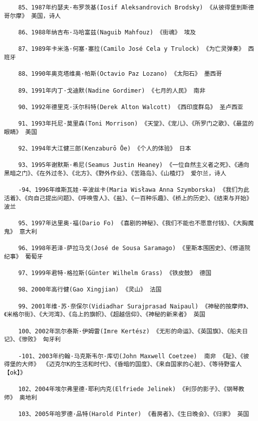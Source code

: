 \documentclass[UTF8]{../RepresentationUniverse}
\begin{document}
\begin{lstlisting}
    85、1987年约瑟夫·布罗茨基(Iosif Aleksandrovich Brodsky) 《从彼得堡到斯德哥尔摩》 美国，诗人
    
    86、1988年纳吉布·马哈富兹(Naguib Mahfouz) 《街魂》 埃及
    
    87、1989年卡米洛·何塞·塞拉(Camilo José Cela y Trulock) 《为亡灵弹奏》 西班牙
    
    88、1990年奥克塔维奥·帕斯(Octavio Paz Lozano) 《太阳石》 墨西哥
    
    89、1991年内丁·戈迪默(Nadine Gordimer) 《七月的人民》 南非
    
    90、1992年德里克·沃尔科特(Derek Alton Walcott) 《西印度群岛》 圣卢西亚
    
    91、1993年托尼·莫里森(Toni Morrison) 《天堂》、《宠儿》、《所罗门之歌》、《最蓝的眼睛》 美国
    
    92、1994年大江健三郎(Kenzaburō Ōe) 《个人的体验》 日本
    
    93、1995年谢默斯·希尼(Seamus Justin Heaney) 《一位自然主义者之死》、《通向黑暗之门》、《在外过冬》、《北方》、《野外作业》、《苦路岛》、《山楂灯》 爱尔兰，诗人
    
    -94、1996年维斯瓦娃·辛波丝卡(Maria Wisława Anna Szymborska) 《我们为此活着》、《向自己提出问题》、《呼唤雪人》、《盐》、《一百种乐趣》、《桥上的历史》、《结束与开始》 波兰
    
    95、1997年达里奥·福(Dario Fo) 《喜剧的神秘》、《我们不能也不愿意付钱》、《大胸魔鬼》 意大利
    
    96、1998年若泽·萨拉马戈(José de Sousa Saramago) 《里斯本围困史》、《修道院纪事》 葡萄牙
    
    97、1999年君特·格拉斯(Günter Wilhelm Grass) 《铁皮鼓》 德国
    
    98、2000年高行健(Gao Xingjian) 《灵山》 法国
    
    99、2001年维·苏·奈保尔(Vidiadhar Surajprasad Naipaul) 《神秘的按摩师》、《米格尔街》、《大河湾》、《岛上的旗帜》、《超越信仰》、《神秘的新来者》 英国
    
    100、2002年凯尔泰斯·伊姆雷(Imre Kertész) 《无形的命运》、《英国旗》、《船夫日记》、《惨败》 匈牙利
    
    -101、2003年约翰·马克斯韦尔·库切(John Maxwell Coetzee)  南非 《耻》、《彼得堡的大师》 《迈克尔K的生活和时代》、《昏暗的国度》、《来自国家的心脏》、《等待野蛮人【ok】》
    
    102、2004年埃尔弗里德·耶利内克(Elfriede Jelinek) 《利莎的影子》、《钢琴教师》 奥地利
    
    103、2005年哈罗德·品特(Harold Pinter) 《看房者》、《生日晚会》、《归家》 英国
    

\end{lstlisting}
\end{document}
